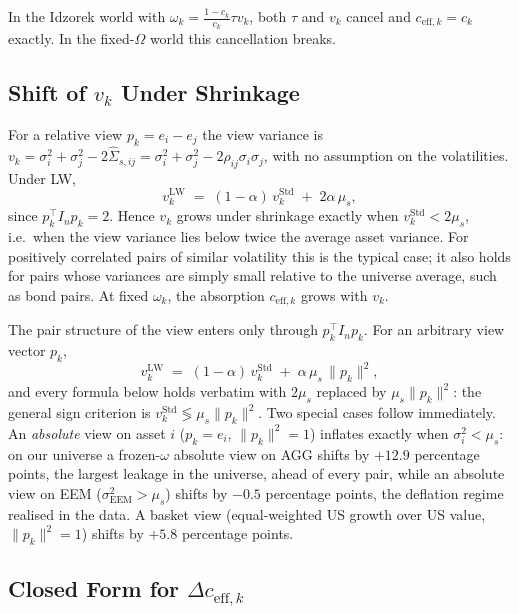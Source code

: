 \documentclass[a4paper,11pt]{article}
\theoremstyle{plain}
\theoremstyle{definition}
\newcommand{\Std}{\mathrm{Std}}
\newcommand{\LW}{\mathrm{LW}}
\newcommand{\eff}{\mathrm{eff}}
\begin{document}
In the Idzorek world with $\omega_k = \tfrac{1-c_k}{c_k}\tau v_k$, both
$\tau$ and $v_k$ cancel and $c_{\eff,k} = c_k$ exactly. In the
fixed-$\Omega$ world this cancellation breaks.

\subsection{Shift of $v_k$ Under Shrinkage}
\label{sec:vk-shift}

For a relative view $p_k = e_i - e_j$ the view variance is
$v_k = \sigma_i^2 + \sigma_j^2 - 2\hat\Sigma_{s,ij}
     = \sigma_i^2 + \sigma_j^2 - 2\rho_{ij}\sigma_i\sigma_j$,
with no assumption on the volatilities. Under LW,
\[
  v_k^{\LW} \;=\; (1 - \alpha)\,v_k^\Std \;+\; 2\alpha\,\mu_s,
\]
since $p_k^\top I_n p_k = 2$. Hence $v_k$ grows under shrinkage exactly
when $v_k^\Std < 2\mu_s$, i.e.\ when the view variance lies below twice
the average asset variance. For positively correlated pairs of similar
volatility this is the typical case; it also holds for pairs whose
variances are simply small relative to the universe average, such as
bond pairs. At fixed $\omega_k$, the absorption $c_{\eff,k}$ grows with
$v_k$.

The pair structure of the view enters only through $p_k^\top I_n p_k$.
For an arbitrary view vector $p_k$,
\[
  v_k^{\LW} \;=\; (1-\alpha)\,v_k^\Std \;+\; \alpha\,\mu_s\,\lVert p_k\rVert^2,
\]
and every formula below holds verbatim with $2\mu_s$ replaced by
$\mu_s\lVert p_k\rVert^2$: the general sign criterion is
$v_k^\Std \lessgtr \mu_s\lVert p_k\rVert^2$. Two special cases follow
immediately. An \emph{absolute} view on asset $i$ ($p_k = e_i$,
$\lVert p_k\rVert^2 = 1$) inflates exactly when $\sigma_i^2 < \mu_s$:
on our universe a frozen-$\omega$ absolute view on AGG shifts by
$+12.9$ percentage points, the largest leakage in the universe, ahead
of every pair, while an absolute view on EEM
($\sigma_{\mathrm{EEM}}^2 > \mu_s$) shifts by $-0.5$ percentage
points, the deflation regime realised in the data. A basket view
(equal-weighted US growth over US value, $\lVert p_k\rVert^2 = 1$)
shifts by $+5.8$ percentage points.

\subsection{Closed Form for $\Delta c_{\eff,k}$}
\label{sec:dceff}
\end{document}
